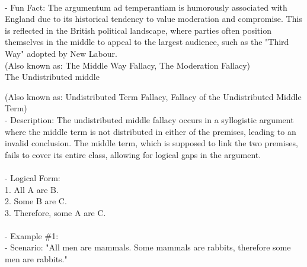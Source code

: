 \documentclass[a4paper,12pt,single,pdftex]{scrartcl}
\begin{document}
    
      
    \\

    
      - Fun Fact: The argumentum ad temperantiam is humorously associated with England due to its historical tendency to value moderation and compromise. This is reflected in the British political landscape, where parties often position themselves in the middle to appeal to the largest audience, such as the "Third Way" adopted by New Labour.
    \\

  
    
      (Also known as: The Middle Way Fallacy, The Moderation Fallacy)
    \\

  

The Undistributed middle
    
      (Also known as: Undistributed Term Fallacy, Fallacy of the Undistributed Middle Term)
    \\

  
    
      - Description: The undistributed middle fallacy occurs in a syllogistic argument where the middle term is not distributed in either of the premises, leading to an invalid conclusion. The middle term, which is supposed to link the two premises, fails to cover its entire class, allowing for logical gaps in the argument.
    \\

    
      
    \\

    
      - Logical Form:
    \\

    
        1. All A are B.
    \\

    
        2. Some B are C.
    \\

    
        3. Therefore, some A are C.
    \\

    
      
    \\

    
      - Example \#1:
    \\

    
        - Scenario: "All men are mammals. Some mammals are rabbits, therefore some men are rabbits."
    \\
\end{document}
